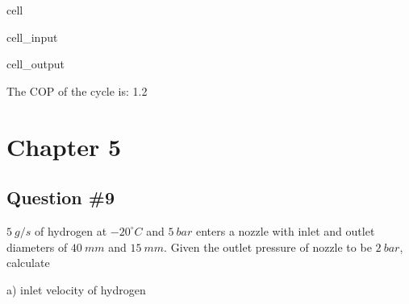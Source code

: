 \documentclass[letterpaper,10pt,english]{jupyterBook}
\begin{document}
\begin{sphinxuseclass}{cell}\begin{sphinxVerbatimInput}

\begin{sphinxuseclass}{cell_input}
\begin{sphinxVerbatim}[commandchars=\\\{\}]
      
 
\end{sphinxVerbatim}

\end{sphinxuseclass}\end{sphinxVerbatimInput}
\begin{sphinxVerbatimOutput}

\begin{sphinxuseclass}{cell_output}
\begin{sphinxVerbatim}[commandchars=\\\{\}]
The COP of the cycle is: 1.2
\end{sphinxVerbatim}

\end{sphinxuseclass}\end{sphinxVerbatimOutput}

\end{sphinxuseclass}
\sphinxstepscope


\section{Chapter 5}
\label{\detokenize{notebooks/Chapter5/CH5-Q9:chapter-5}}\label{\detokenize{notebooks/Chapter5/CH5-Q9::doc}}

\subsection{Question \#9}
\label{\detokenize{notebooks/Chapter5/CH5-Q9:question-9}}
\sphinxAtStartPar
\(5\:g/s\) of hydrogen at \(-20^{\circ} C\) and \(5\:bar\) enters a nozzle with inlet and outlet diameters of \(40\:mm\) and \(15\:mm\). Given the outlet pressure of nozzle to be \(2\:bar\), calculate

\sphinxAtStartPar
a) inlet velocity of hydrogen
\end{document}
